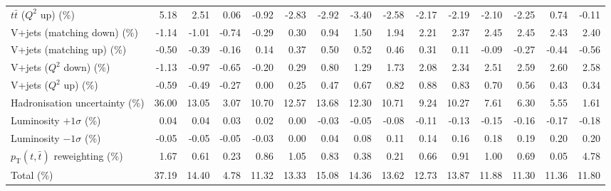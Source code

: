 \begin{table}[htbp]
{\begin{tabular}{lrrrrrrrrrrrrrr}
$t\bar{t}$ ($Q^{2}$ up) (\%) & 5.18 & 2.51 & 0.06 & -0.92 & -2.83 & -2.92 & -3.40 & -2.58 & -2.17 & -2.19 & -2.10 & -2.25 & 0.74 & -0.11 \\ 
V+jets (matching down) (\%) & -1.14 & -1.01 & -0.74 & -0.29 & 0.30 & 0.94 & 1.50 & 1.94 & 2.21 & 2.37 & 2.45 & 2.45 & 2.43 & 2.40 \\ 
V+jets (matching up) (\%) & -0.50 & -0.39 & -0.16 & 0.14 & 0.37 & 0.50 & 0.52 & 0.46 & 0.31 & 0.11 & -0.09 & -0.27 & -0.44 & -0.56 \\ 
V+jets ($Q^{2}$ down) (\%) & -1.13 & -0.97 & -0.65 & -0.20 & 0.29 & 0.80 & 1.29 & 1.73 & 2.08 & 2.34 & 2.51 & 2.59 & 2.60 & 2.58 \\ 
V+jets ($Q^{2}$ up) (\%) & -0.59 & -0.49 & -0.27 & 0.00 & 0.25 & 0.47 & 0.67 & 0.82 & 0.88 & 0.83 & 0.70 & 0.56 & 0.43 & 0.34 \\ 
Hadronisation uncertainty (\%) & 36.00 & 13.05 & 3.07 & 10.70 & 12.57 & 13.68 & 12.30 & 10.71 & 9.24 & 10.27 & 7.61 & 6.30 & 5.55 & 1.61 \\ 
Luminosity $+1\sigma$ (\%) & 0.04 & 0.04 & 0.03 & 0.02 & 0.00 & -0.03 & -0.05 & -0.08 & -0.11 & -0.13 & -0.15 & -0.16 & -0.17 & -0.18 \\ 
Luminosity $-1\sigma$ (\%) & -0.05 & -0.05 & -0.05 & -0.03 & 0.00 & 0.04 & 0.08 & 0.11 & 0.14 & 0.16 & 0.18 & 0.19 & 0.20 & 0.20 \\ 
$p_\mathrm{T}(t,\bar{t})$ reweighting (\%) & 1.67 & 0.61 & 0.23 & 0.86 & 1.05 & 0.83 & 0.38 & 0.21 & 0.66 & 0.91 & 1.00 & 0.69 & 0.05 & 4.78 \\ 
\hline 
Total (\%) & 37.19  & 14.40  & 4.78  & 11.32  & 13.33  & 15.08  & 14.36  & 13.62  & 12.73  & 13.87  & 11.88  & 11.30  & 11.36  & 11.80 \\ 
\hline 
\end{tabular}
}
\end{table}
